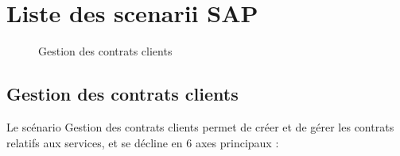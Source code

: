 \section{Liste des scenarii SAP}

\begin{figure}[H]
    \label{fig-gestion-contrats-client}
    \noindent{}
    \caption{Gestion des contrats clients}
\end{figure}

\subsection{Gestion des contrats clients}

Le scénario Gestion des contrats clients permet de créer et de gérer les contrats relatifs aux
services, et se décline en 6 axes principaux : \\

